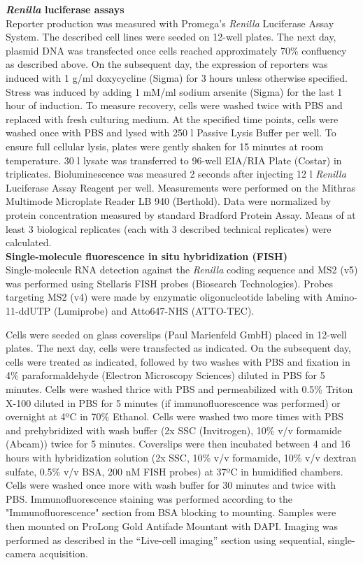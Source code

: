 \textbf{\textit{Renilla} luciferase assays} \\
Reporter production was measured with Promega’s \textit{Renilla} Luciferase Assay System.
The described cell lines were seeded on 12-well plates.
The next day, plasmid DNA was transfected once cells reached approximately 70\% confluency as described above.
On the subsequent day, the expression of reporters was induced with 1 \textmu g/ml
    doxycycline (Sigma) for 3 hours unless otherwise specified.
Stress was induced by adding 1 mM/ml sodium arsenite (Sigma) for the last 1 hour of induction.
To measure recovery, cells were washed twice with PBS and replaced with fresh culturing medium.
At the specified time points, cells were washed once with PBS and lysed with 250 \textmu l Passive Lysis Buffer per well.
To ensure full cellular lysis, plates were gently shaken for 15 minutes at room temperature.
30 \textmu l lysate was transferred to 96-well EIA/RIA Plate (Costar) in triplicates.
Bioluminescence was measured 2 seconds after injecting 12 \textmu l \textit{Renilla} Luciferase Assay Reagent per well.
Measurements were performed on the Mithras Multimode Microplate Reader LB 940 (Berthold).
Data were normalized by protein concentration measured by standard Bradford Protein Assay.
Means of at least 3 biological replicates (each with 3 described technical replicates) were calculated.
\\

\textbf{Single-molecule fluorescence in situ hybridization (FISH)} \\
Single-molecule RNA detection against the \textit{Renilla} coding sequence and MS2 (v5) was performed using Stellaris FISH probes (Biosearch Technologies).
Probes targeting MS2 (v4) were made by enzymatic oligonucleotide labeling \cite{gaspar_rna_2018} with Amino-11-ddUTP (Lumiprobe) and Atto647-NHS (ATTO-TEC). 

Cells were seeded on glass coverslips (Paul Marienfeld GmbH) placed in 12-well plates.
The next day, cells were transfected as indicated.
On the subsequent day, cells were treated as indicated, followed by two washes with PBS and fixation in 4\% paraformaldehyde (Electron Microscopy Sciences) diluted in PBS for 5 minutes.
Cells were washed thrice with PBS and permeabilized with 0.5\% Triton X-100 diluted in PBS for 5 minutes (if immunofluorescence was performed) or overnight at 4ºC in 70\% Ethanol.
Cells were washed two more times with PBS and prehybridized with wash buffer (2x SSC (Invitrogen), 10\% v/v formamide (Abcam)) twice for 5 minutes.
Coverslips were then incubated between 4 and 16 hours with hybridization solution (2x SSC, 10\% v/v formamide, 10\% v/v dextran sulfate, 0.5\% v/v BSA, 200 nM FISH probes) at 37ºC in humidified chambers.
Cells were washed once more with wash buffer for 30 minutes and twice with PBS.
Immunofluorescence staining was performed according to the "Immunofluorescence" section from BSA blocking to mounting.
Samples were then mounted on ProLong Gold Antifade Mountant with DAPI.
Imaging was performed as described in the “Live-cell imaging” section using sequential, single-camera acquisition.
\\

